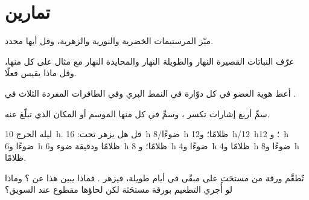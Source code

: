 \section{تمارين}

\begin{exercise}[$\star$]\label{exo:b2:plant-flowering:1}
ميّز المرستيمات الخضرية والنورية والزهرية، وقل
أيها محدد.
\end{exercise}

\begin{exercise}[$\star$]\label{exo:b2:plant-flowering:2}
عرّف النباتات القصيرة النهار والطويلة النهار والمحايدة النهار مع مثال
على كل منها، وقل ماذا يقيس  فعلًا.
\end{exercise}

\begin{exercise}[$\star$]\label{exo:b2:plant-flowering:3}
أعط هوية العضو في كل دوّارة في النمط البري وفي
الطافرات المفردة الثلاث في .
\end{exercise}

\begin{exercise}[$\star$]\label{exo:b2:plant-flowering:4}
سمِّ أربع إشارات تكسر  ، وسمِّ في كل منها الموسم
أو المكان الذي تبلّغ عنه.
\end{exercise}

\begin{exercise}[$\star\star$]\label{exo:b2:plant-flowering:5}
 ليله الحرج \qty{10}{h}. قل هل
يزهر تحت: \qty{16}{h} ضوءًا/\qty{8}{h} ظلامًا؛ و\qty{12}{h}/\qty{12}{h}؛ و
\qty{12}{h} ضوءًا و\qty{6}{h} ظلامًا ودقيقة ضوء و\qty{6}{h} ظلامًا؛ و
\qty{8}{h} ضوءًا و\qty{4}{h} ظلامًا و\qty{4}{h} ضوءًا و\qty{8}{h} ظلامًا.
\end{exercise}

\begin{exercise}[$\star\star$]\label{exo:b2:plant-flowering:6}
تُطعَّم ورقة من  مستحَث على  مبقًى في أيام طويلة، فيزهر . فماذا يبين
هذا عن ؟ وماذا لو أُجري التطعيم بورقة
مستحَثة لكن لحاؤها مقطوع عند
السويق؟
\end{exercise}

